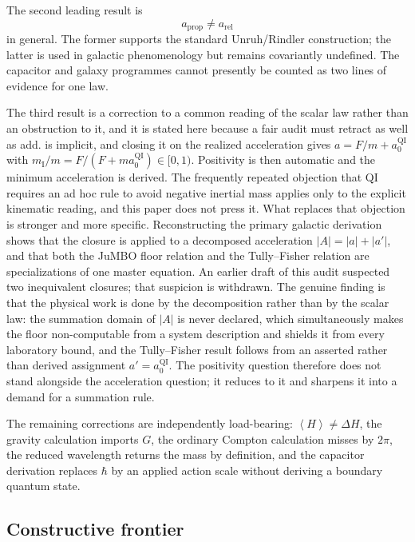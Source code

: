 \documentclass[11pt]{article}
\newcommand{\avg}[1]{\left\langle #1\right\rangle}
\newcommand{\QI}{\mathrm{QI}}
\begin{document}
The second leading result is
\begin{equation}
    a_{\mathrm{prop}}\neq a_{\mathrm{rel}}
\end{equation}
in general. The former supports the standard Unruh/Rindler construction; the latter is used in galactic phenomenology but remains covariantly undefined. The capacitor and galaxy programmes cannot presently be counted as two lines of evidence for one law.

The third result is a correction to a common reading of the scalar law rather than an obstruction to it, and it is stated here because a fair audit must retract as well as add.  is implicit, and closing it on the realized acceleration gives \(a=F/m+a_{0}^{\QI}\) with \(m_{\mathrm I}/m=F/(F+ma_{0}^{\QI})\in[0,1)\). Positivity is then automatic and the minimum acceleration is derived. The frequently repeated objection that QI requires an ad hoc rule to avoid negative inertial mass applies only to the explicit kinematic reading, and this paper does not press it. What replaces that objection is stronger and more specific. Reconstructing the primary galactic derivation shows that the closure is applied to a decomposed acceleration \(|A|=|a|+|a'|\), and that both the JuMBO floor relation and the Tully--Fisher relation are specializations of one master equation. An earlier draft of this audit suspected two inequivalent closures; that suspicion is withdrawn. The genuine finding is that the physical work is done by the decomposition rather than by the scalar law: the summation domain of \(|A|\) is never declared, which simultaneously makes the floor non-computable from a system description and shields it from every laboratory bound, and the Tully--Fisher result follows from an asserted rather than derived assignment \(a'=a_{0}^{\QI}\). The positivity question therefore does not stand alongside the acceleration question; it reduces to it and sharpens it into a demand for a summation rule.

The remaining corrections are independently load-bearing: \(\avg{H}\neq\Delta H\), the gravity calculation imports \(G\), the ordinary Compton calculation misses by \(2\pi\), the reduced wavelength returns the mass by definition, and the capacitor derivation replaces \(\hbar\) by an applied action scale without deriving a boundary quantum state.

\subsection{Constructive frontier}
\end{document}
